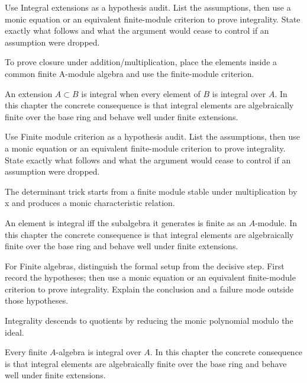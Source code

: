 \begin{exercise}\label{exr:v19-02}
Use Integral extensions as a hypothesis audit. List the assumptions, then use a monic equation or an equivalent finite-module criterion to prove integrality. State exactly what follows and what the argument would cease to control if an assumption were dropped.
\end{exercise}
\begin{hint}
To prove closure under addition/multiplication, place the elements inside a common finite A-module algebra and use the finite-module criterion.
\end{hint}
\begin{solution}
An extension $A\subset B$ is integral when every element of $B$ is integral over $A$. In this chapter the concrete consequence is that integral elements are algebraically finite over the base ring and behave well under finite extensions.
\end{solution}

\begin{exercise}\label{exr:v19-03}
Use Finite module criterion as a hypothesis audit. List the assumptions, then use a monic equation or an equivalent finite-module criterion to prove integrality. State exactly what follows and what the argument would cease to control if an assumption were dropped.
\end{exercise}
\begin{hint}
The determinant trick starts from a finite module stable under multiplication by x and produces a monic characteristic relation.
\end{hint}
\begin{solution}
An element is integral iff the subalgebra it generates is finite as an $A$-module. In this chapter the concrete consequence is that integral elements are algebraically finite over the base ring and behave well under finite extensions.
\end{solution}

\begin{exercise}\label{exr:v19-04}
For Finite algebras, distinguish the formal setup from the decisive step. First record the hypotheses; then use a monic equation or an equivalent finite-module criterion to prove integrality. Explain the conclusion and a failure mode outside those hypotheses.
\end{exercise}
\begin{hint}
Integrality descends to quotients by reducing the monic polynomial modulo the ideal.
\end{hint}
\begin{solution}
Every finite $A$-algebra is integral over $A$. In this chapter the concrete consequence is that integral elements are algebraically finite over the base ring and behave well under finite extensions.
\end{solution}

